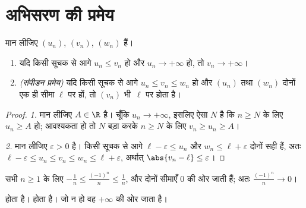 \section{अभिसरण की प्रमेय}

\begin{theorem}[तुलना और संपीडन प्रमेय]\label{thm:g12:seq:squeeze}
मान लीजिए $(u_n)$, $(v_n)$, $(w_n)$  हैं।
\begin{enumerate}
  \item यदि किसी सूचक से आगे $u_n \leq v_n$ हो और $u_n \to +\infty$ हो, तो $v_n \to +\infty$।
  \item \emph{(संपीडन प्रमेय)} यदि किसी सूचक से आगे
        $u_n \leq v_n \leq w_n$ हो और $(u_n)$ तथा $(w_n)$ दोनों एक ही सीमा $\ell$ पर  हों,
        तो $(v_n)$ भी~$\ell$ पर  होता है।
\end{enumerate}
\end{theorem}

\begin{proof}
\emph{1.} मान लीजिए $A \in \R$ है। चूँकि $u_n \to +\infty$, इसलिए ऐसा $N$ है कि $n \geq N$ के
लिए $u_n \geq A$ हो; आवश्यकता हो तो $N$ बड़ा करके $n \geq N$ के लिए $v_n \geq u_n \geq A$।

\emph{2.} मान लीजिए $\varepsilon > 0$ है। किसी सूचक से आगे $\ell - \varepsilon \leq u_n$ और $w_n \leq \ell + \varepsilon$ दोनों सही
हैं, अतः $\ell - \varepsilon \leq u_n \leq v_n \leq w_n \leq \ell + \varepsilon$, अर्थात् $\abs{v_n - \ell} \leq \varepsilon$।
\end{proof}

\begin{example}
सभी $n \geq 1$ के लिए $-\frac{1}{n} \leq \frac{(-1)^n}{n} \leq \frac{1}{n}$, और दोनों सीमाएँ $0$ की ओर जाती हैं; अतः $\frac{(-1)^n}{n} \to 0$।
\end{example}

\begin{theorem}\label{thm:g12:seq:monotone}
    होता है।   
 होता है। जो    न हो वह $+\infty$ की ओर जाता है।
\end{theorem}

